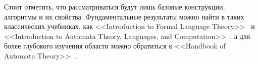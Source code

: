 Стоит отметить, что рассматриваться будут лишь базовые конструкции, алгоритмы и их свойства.
Фундаментальные результаты можно найти в таких классических учебниках, как <<Introduction to Formal Language Theory>>~\cite{10.5555/578595} и <<Introduction to Automata Theory, Languages, and Computation>>~\cite{Hopcroft+Ullman/79/Introduction}, а для более глубокого изучения области можно обратиться к <<Handbook of Automata Theory>>~\cite{DBLP:books/ems/21/P2021}.











